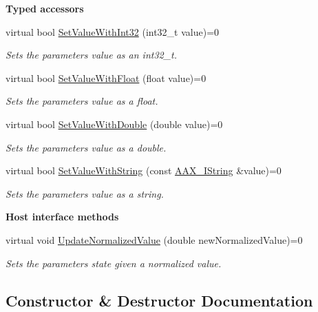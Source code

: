 \begin{Indent}{\bf Typed accessors}
\begin{DoxyCompactItemize}
virtual bool \hyperlink{a00108_aa2b8cfdd30ff25e47c4c2a8609d1e06f}{Set\+Value\+With\+Int32} (int32\+\_\+t value)=0
\begin{DoxyCompactList}\small\item\em Sets the parameter\textquotesingle{}s value as an int32\+\_\+t. \end{DoxyCompactList}\item 
virtual bool \hyperlink{a00108_a1d37b80bc3a9c4e53fc2c1684f47dfb7}{Set\+Value\+With\+Float} (float value)=0
\begin{DoxyCompactList}\small\item\em Sets the parameter\textquotesingle{}s value as a float. \end{DoxyCompactList}\item 
virtual bool \hyperlink{a00108_a95e2d31931b586f43e42d41f2dce7c6d}{Set\+Value\+With\+Double} (double value)=0
\begin{DoxyCompactList}\small\item\em Sets the parameter\textquotesingle{}s value as a double. \end{DoxyCompactList}\item 
virtual bool \hyperlink{a00108_a0f1ecef3d86f0ea1fef4255a9294d1df}{Set\+Value\+With\+String} (const \hyperlink{a00113}{A\+A\+X\+\_\+\+I\+String} \&value)=0
\begin{DoxyCompactList}\small\item\em Sets the parameter\textquotesingle{}s value as a string. \end{DoxyCompactList}\end{DoxyCompactItemize}
\end{Indent}
\begin{Indent}{\bf Host interface methods}\par
\begin{DoxyCompactItemize}
\item 
virtual void \hyperlink{a00108_a408918950ea63aa0e85b90e588856624}{Update\+Normalized\+Value} (double new\+Normalized\+Value)=0
\begin{DoxyCompactList}\small\item\em Sets the parameter\textquotesingle{}s state given a normalized value. \end{DoxyCompactList}\end{DoxyCompactItemize}
\end{Indent}


\subsection{Constructor \& Destructor Documentation}
\hypertarget{a00108_a69062a223819c3467ea308c816b28c6b}{}
